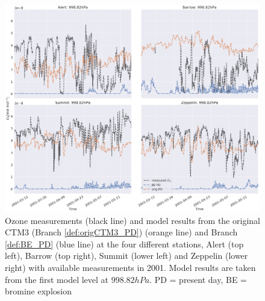 \begin{figure}
    \centering
    \includegraphics[width = \linewidth]{Chapter6_Results/images/ozone_2001_compObsOrigBE.png}
    \caption{Ozone measurements (black line) and model results from the original CTM3 (Branch \ref{def:origCTM3_PD}) (orange line) and Branch \ref{def:BE_PD} (blue line) at the four different stations, Alert (top left), Barrow (top right), Summit (lower left) and Zeppelin (lower right) with available measurements in 2001. Model results are taken from the first model level at $998.82 hPa$. PD = present day, BE = bromine explosion}
    \label{fig:CompObsOrigBE}
\end{figure}